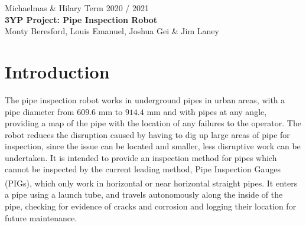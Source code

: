 \documentclass[11pt]{article}		%
\begin{document}
	
	\flushleft
	\raggedright

	\begin{center}
		\vspace*{2cm}
		Michaelmas \& Hilary Term 2020 / 2021\\ %
		\vspace*{6cm}
		\huge{\textbf{3YP Project: Pipe Inspection Robot}}\\ 
		\vspace*{6cm}
		\large{Monty Beresford, Louis Emanuel, Joshua Gei \& Jim Laney} %
		\thispagestyle{empty} %
	\end{center}

	\newpage
	
	\tableofcontents
	\thispagestyle{empty} %
	\newpage

	\setcounter{page}{1}
	
	\section{Introduction}
	
	The pipe inspection robot works in underground pipes in urban areas, with a pipe diameter from $609.6$ mm to $914.4$ mm and with pipes at any angle, providing a map of the pipe with the location of any failures to the operator. %
	The robot reduces the disruption caused by having to dig up large areas of pipe for inspection, since the issue can be located and smaller, less disruptive work can be undertaken.
	It is intended to provide an inspection method for pipes which cannot be inspected by the current leading method, Pipe Inspection Gauges (PIGs), which only work in horizontal or near horizontal straight pipes\textsuperscript{\cite{mills2017advances}}.
	It enters a pipe using a launch tube, and travels autonomously along the inside of the pipe, checking for evidence of cracks and corrosion and logging their location for future maintenance.
	\\
	
\end{document}
